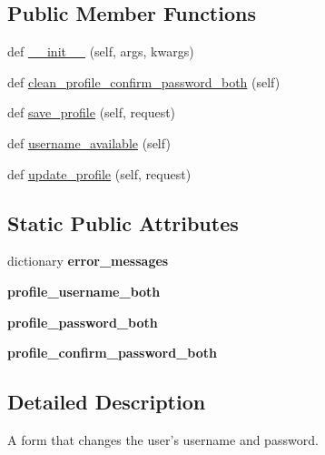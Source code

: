 \subsection*{Public Member Functions}
\begin{DoxyCompactItemize}
\item 
def \mbox{\hyperlink{classcapstoneproject_1_1app__forms_1_1change__username__password__form_1_1_change_username_password_form_a7fb444cde23abc0df0b132069b62af60}{\+\_\+\+\_\+init\+\_\+\+\_\+}} (self, args, kwargs)
\item 
def \mbox{\hyperlink{classcapstoneproject_1_1app__forms_1_1change__username__password__form_1_1_change_username_password_form_a33508aa9c9deef2bad9e6ed467702d5b}{clean\+\_\+profile\+\_\+confirm\+\_\+password\+\_\+both}} (self)
\item 
def \mbox{\hyperlink{classcapstoneproject_1_1app__forms_1_1change__username__password__form_1_1_change_username_password_form_ae8adcfbbcebcc12aa8d748ce09392a17}{save\+\_\+profile}} (self, request)
\item 
def \mbox{\hyperlink{classcapstoneproject_1_1app__forms_1_1change__username__password__form_1_1_change_username_password_form_a06a27de23dc0cbf0659e09888df35d90}{username\+\_\+available}} (self)
\item 
def \mbox{\hyperlink{classcapstoneproject_1_1app__forms_1_1change__username__password__form_1_1_change_username_password_form_ae78e5a74fad9efbe4eceb713a69ce322}{update\+\_\+profile}} (self, request)
\end{DoxyCompactItemize}
\subsection*{Static Public Attributes}
\begin{DoxyCompactItemize}
\item 
dictionary {\bfseries error\+\_\+messages}
\item 
{\bfseries profile\+\_\+username\+\_\+both}
\item 
{\bfseries profile\+\_\+password\+\_\+both}
\item 
{\bfseries profile\+\_\+confirm\+\_\+password\+\_\+both}
\end{DoxyCompactItemize}


\subsection{Detailed Description}
\begin{DoxyVerb}    A form that changes the user's username and password.
\end{DoxyVerb}
 

